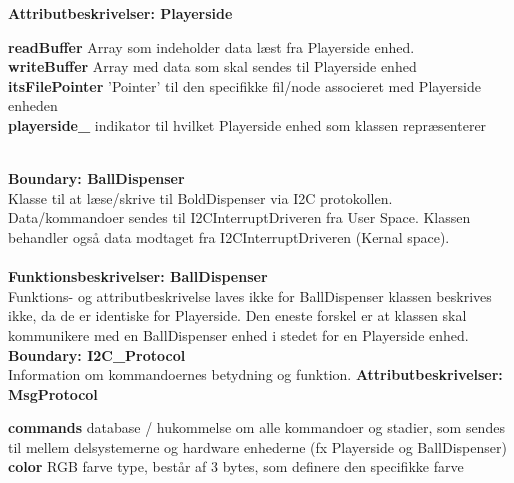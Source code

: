 \documentclass[Arkitektur/System_main.tex]{subfiles}
\begin{document}
{\large\textbf{Attributbeskrivelser: Playerside}}
\begin{adjustwidth}{1cm}{0pt}
\textbf{readBuffer} Array som indeholder data læst fra Playerside enhed. \\[0.2cm]
\textbf{writeBuffer} Array med data som skal sendes til Playerside enhed \\[0.2cm]
\textbf{itsFilePointer} 'Pointer' til den specifikke fil/node associeret med Playerside enheden\\[0.2cm]
\textbf{playerside\_} indikator til hvilket Playerside enhed som klassen repræsenterer\\[0.2cm]
\end{adjustwidth}\\
\textbf{Boundary:  BallDispenser}\\
Klasse til at læse/skrive til BoldDispenser via I2C protokollen. Data/kommandoer sendes til I2CInterruptDriveren fra User Space. Klassen behandler også data modtaget fra I2CInterruptDriveren (Kernal space). \\\\
{\large\textbf{Funktionsbeskrivelser: BallDispenser}}\\[0.2cm]
Funktions- og attributbeskrivelse laves ikke for BallDispenser klassen beskrives ikke, da de er identiske for Playerside. Den eneste forskel er at klassen skal kommunikere med en BallDispenser enhed i stedet for en Playerside enhed. \\
\large{\textbf{Boundary:  I2C\_Protocol}}\\
Information om kommandoernes betydning og funktion. 
{\large\textbf{Attributbeskrivelser: MsgProtocol}}
\begin{adjustwidth}{1cm}{0pt}
\textbf{commands} database / hukommelse om alle kommandoer og stadier, som sendes til mellem delsystemerne og hardware enhederne (fx Playerside og BallDispenser)\\[0.2cm]
\textbf{color} RGB farve type, består af 3 bytes, som definere den specifikke farve\\[0.2cm]
\end{adjustwidth}\\
\end{document}
